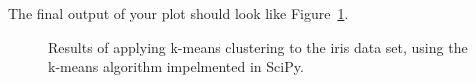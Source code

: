 The final output of your plot should look like Figure~\ref{fig:pykmeans}.

\begin{figure}[ht!]
  \caption{Results of applying k-means clustering to the iris data set, using the k-means algorithm impelmented in SciPy.\label{fig:pykmeans}}
\end{figure}












